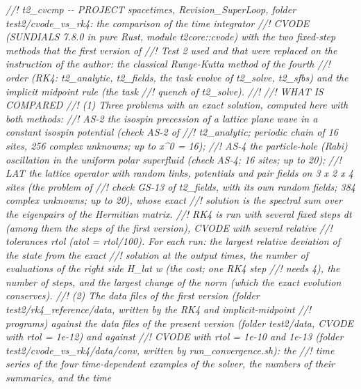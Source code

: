 \documentclass[
  10pt,
]{article}
\newenvironment{Shaded}{}{}
\newcommand{\CommentTok}[1]{\textcolor[rgb]{0.38,0.63,0.69}{\textit{#1}}}
\begin{document}
\begin{Shaded}
\begin{Highlighting}[]
\CommentTok{//! t2\_cvcmp {-}{-} PROJECT spacetimes, Revision\_SuperLoop, folder test2/cvode\_vs\_rk4: the comparison of the time integrator}
\CommentTok{//! CVODE (SUNDIALS 7.8.0 in pure Rust, module t2core::cvode) with the two fixed{-}step methods that the first version of}
\CommentTok{//! Test 2 used and that were replaced on the instruction of the author: the classical Runge{-}Kutta method of the fourth}
\CommentTok{//! order (RK4: t2\_analytic, t2\_fields, the task evolve of t2\_solve, t2\_sfbs) and the implicit midpoint rule (the task}
\CommentTok{//! quench of t2\_solve).}
\CommentTok{//!}
\CommentTok{//! WHAT IS COMPARED}
\CommentTok{//!   (1) Three problems with an exact solution, computed here with both methods:}
\CommentTok{//!         AS{-}2  the isospin precession of a lattice plane wave in a constant isospin potential (check AS{-}2 of}
\CommentTok{//!               t2\_analytic; periodic chain of 16 sites, 256 complex unknowns; up to x\^{}0 = 16);}
\CommentTok{//!         AS{-}4  the particle{-}hole (Rabi) oscillation in the uniform polar superfluid (check AS{-}4; 16 sites; up to 20);}
\CommentTok{//!         LAT   the lattice operator with random links, potentials and pair fields on 3 x 2 x 4 sites (the problem of}
\CommentTok{//!               check GS{-}13 of t2\_fields, with its own random fields; 384 complex unknowns; up to 20), whose exact}
\CommentTok{//!               solution is the spectral sum over the eigenpairs of the Hermitian matrix.}
\CommentTok{//!       RK4 is run with several fixed steps dt (among them the steps of the first version), CVODE with several relative}
\CommentTok{//!       tolerances rtol (atol = rtol/100).  For each run: the largest relative deviation of the state from the exact}
\CommentTok{//!       solution at the output times, the number of evaluations of the right side H\_lat w (the cost; one RK4 step}
\CommentTok{//!       needs 4), the number of steps, and the largest change of the norm (which the exact evolution conserves).}
\CommentTok{//!   (2) The data files of the first version (folder test2/rk4\_reference/data, written by the RK4 and implicit{-}midpoint}
\CommentTok{//!       programs) against the data files of the present version (folder test2/data, CVODE with rtol = 1e{-}12) and against}
\CommentTok{//!       CVODE with rtol = 1e{-}10 and 1e{-}13 (folder test2/cvode\_vs\_rk4/data/conv, written by run\_convergence.sh): the}
\CommentTok{//!       time series of the four time{-}dependent examples of the solver, the numbers of their summaries, and the time}

\end{Highlighting}
\end{Shaded}
\end{document}
